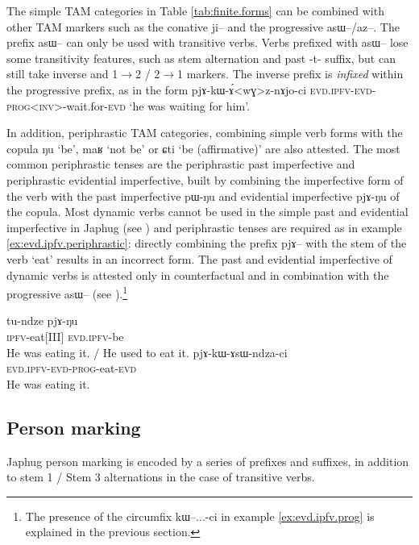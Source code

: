 \documentclass[oldfontcommands,oneside,a4paper,11pt]{article}
\newcommand{\ipa}[1]{{\phon#1}} %
\begin{document}
The simple TAM categories in Table \ref{tab:finite.forms} can be combined with other TAM markers such as the conative \ipa{ji--} and the progressive \ipa{asɯ--}/\ipa{az--}. The prefix \ipa{asɯ--} can only be used with transitive verbs. Verbs prefixed with \ipa{asɯ--} lose some transitivity features, such as stem alternation and past \ipa{-t-} suffix, but can still take inverse and 1$\rightarrow$2 / 2$\rightarrow$1 markers. The inverse prefix is \textit{infixed} within the progressive prefix, as in the form \ipa{pjɤ-kɯ-ɤ́<wɣ>z-nɤjo-ci} \textsc{evd.ipfv-evd-prog<inv>}-wait.for-\textsc{evd} `he was waiting for him'.

In addition, periphrastic TAM categories, combining simple verb forms with the copula \ipa{ŋu} `be', \ipa{maʁ} `not be' or \ipa{ɕti} `be (affirmative)' are also attested. The most common periphrastic tenses are the periphrastic past imperfective and periphrastic evidential imperfective, built by combining the imperfective form of the verb with the past imperfective \ipa{pɯ-ŋu} and evidential imperfective \ipa{pjɤ-ŋu} of the copula. Most dynamic verbs cannot be used in the simple past and evidential imperfective in Japhug (see \citealt{lin11direction}) and periphrastic tenses are required as in example \ref{ex:evd.ipfv.periphrastic}: directly combining the prefix \ipa{pjɤ--} with the stem of the verb `eat' results  in an incorrect form. The past and evidential imperfective of dynamic verbs is attested only in counterfactual and in combination with the progressive \ipa{asɯ--} (see \citealt[297-301]{jacques14linking}).\footnote{The presence of the circumfix \ipa{kɯ--...-ci} in example \ref{ex:evd.ipfv.prog} is explained in the previous section.}

\begin{exe}
\ex \label{ex:evd.ipfv.periphrastic}
\gll
\ipa{tu-ndze} \ipa{pjɤ-ŋu} \\
 \textsc{ipfv}-eat[III] \textsc{evd.ipfv}-be \\
\glt He was eating it. / He used to eat it.
\ex \label{ex:evd.ipfv.prog}
\gll
 \ipa{pjɤ-kɯ-ɤsɯ-ndza-ci} \\
 \textsc{evd.ipfv-evd-prog}-eat-\textsc{evd} \\
\glt He was eating it.
\end{exe}



\subsection{Person marking}
Japhug person marking is encoded by a series of prefixes and suffixes, in addition to stem 1 / Stem 3 alternations in the case of transitive verbs.
\end{document}
